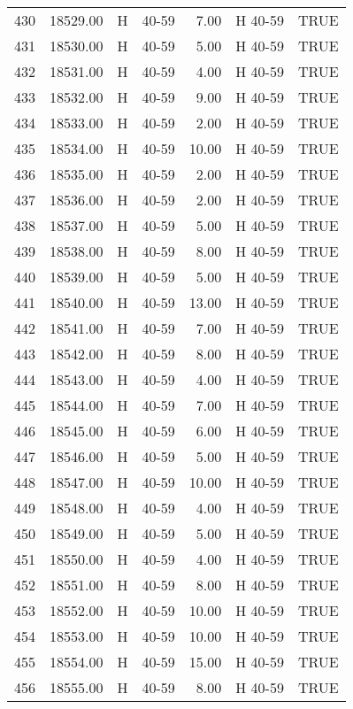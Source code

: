 \begin{table}[ht]
\begin{tabular}{rrllrll}
  430 & 18529.00 & H & 40-59 & 7.00 & H 40-59 & TRUE \\ 
  431 & 18530.00 & H & 40-59 & 5.00 & H 40-59 & TRUE \\ 
  432 & 18531.00 & H & 40-59 & 4.00 & H 40-59 & TRUE \\ 
  433 & 18532.00 & H & 40-59 & 9.00 & H 40-59 & TRUE \\ 
  434 & 18533.00 & H & 40-59 & 2.00 & H 40-59 & TRUE \\ 
  435 & 18534.00 & H & 40-59 & 10.00 & H 40-59 & TRUE \\ 
  436 & 18535.00 & H & 40-59 & 2.00 & H 40-59 & TRUE \\ 
  437 & 18536.00 & H & 40-59 & 2.00 & H 40-59 & TRUE \\ 
  438 & 18537.00 & H & 40-59 & 5.00 & H 40-59 & TRUE \\ 
  439 & 18538.00 & H & 40-59 & 8.00 & H 40-59 & TRUE \\ 
  440 & 18539.00 & H & 40-59 & 5.00 & H 40-59 & TRUE \\ 
  441 & 18540.00 & H & 40-59 & 13.00 & H 40-59 & TRUE \\ 
  442 & 18541.00 & H & 40-59 & 7.00 & H 40-59 & TRUE \\ 
  443 & 18542.00 & H & 40-59 & 8.00 & H 40-59 & TRUE \\ 
  444 & 18543.00 & H & 40-59 & 4.00 & H 40-59 & TRUE \\ 
  445 & 18544.00 & H & 40-59 & 7.00 & H 40-59 & TRUE \\ 
  446 & 18545.00 & H & 40-59 & 6.00 & H 40-59 & TRUE \\ 
  447 & 18546.00 & H & 40-59 & 5.00 & H 40-59 & TRUE \\ 
  448 & 18547.00 & H & 40-59 & 10.00 & H 40-59 & TRUE \\ 
  449 & 18548.00 & H & 40-59 & 4.00 & H 40-59 & TRUE \\ 
  450 & 18549.00 & H & 40-59 & 5.00 & H 40-59 & TRUE \\ 
  451 & 18550.00 & H & 40-59 & 4.00 & H 40-59 & TRUE \\ 
  452 & 18551.00 & H & 40-59 & 8.00 & H 40-59 & TRUE \\ 
  453 & 18552.00 & H & 40-59 & 10.00 & H 40-59 & TRUE \\ 
  454 & 18553.00 & H & 40-59 & 10.00 & H 40-59 & TRUE \\ 
  455 & 18554.00 & H & 40-59 & 15.00 & H 40-59 & TRUE \\ 
  456 & 18555.00 & H & 40-59 & 8.00 & H 40-59 & TRUE \\ 

\end{tabular}
\end{table}
